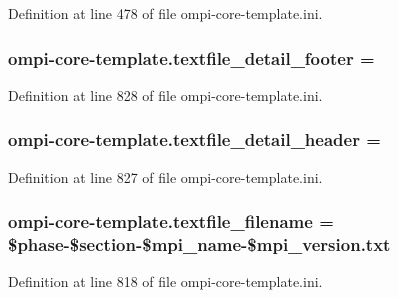 Definition at line 478 of file ompi-\/core-\/template.\-ini.

\hypertarget{namespaceompi-core-template_a7aa5c68b452e5d00399b05b5d7a0fc3e}{
\subsubsection[{textfile\-\_\-detail\-\_\-footer}]{\setlength{\rightskip}{0pt plus 5cm}ompi-\/core-\/template.\-textfile\-\_\-detail\-\_\-footer =}}\label{namespaceompi-core-template_a7aa5c68b452e5d00399b05b5d7a0fc3e}


Definition at line 828 of file ompi-\/core-\/template.\-ini.

\hypertarget{namespaceompi-core-template_a2d9a54226a0449dae1d753b5988f2f06}{
\subsubsection[{textfile\-\_\-detail\-\_\-header}]{\setlength{\rightskip}{0pt plus 5cm}ompi-\/core-\/template.\-textfile\-\_\-detail\-\_\-header =}}\label{namespaceompi-core-template_a2d9a54226a0449dae1d753b5988f2f06}


Definition at line 827 of file ompi-\/core-\/template.\-ini.

\hypertarget{namespaceompi-core-template_a05c2e1e183c61b7a2bd4c0f9407bddf8}{
\subsubsection[{textfile\-\_\-filename}]{\setlength{\rightskip}{0pt plus 5cm}ompi-\/core-\/template.\-textfile\-\_\-filename = \$phase-\/\$section-\/\$mpi\-\_\-name-\/\$mpi\-\_\-version.\-txt}}\label{namespaceompi-core-template_a05c2e1e183c61b7a2bd4c0f9407bddf8}


Definition at line 818 of file ompi-\/core-\/template.\-ini.

